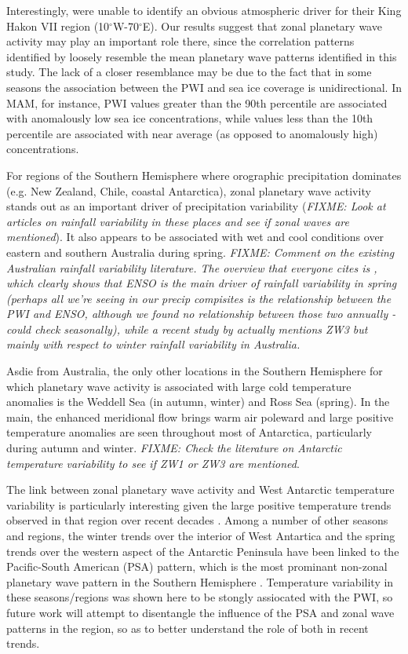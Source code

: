 Interestingly, \citet{Raphael2014} were unable to identify an obvious atmospheric driver for their King Hakon VII region (10$^{\circ}$W-70$^{\circ}$E). Our results suggest that zonal planetary wave activity may play an important role there, since the correlation patterns identified by \citet{Raphael2014} loosely resemble the mean planetary wave patterns identified in this study. The lack of a closer resemblance may be due to the fact that in some seasons the association between the PWI and sea ice coverage is unidirectional. In MAM, for instance, PWI values greater than the 90th percentile are associated with anomalously low sea ice concentrations, while values less than the 10th percentile are associated with near average (as opposed to anomalously high) concentrations.

For regions of the Southern Hemisphere where orographic precipitation dominates (e.g. New Zealand, Chile, coastal Antarctica), zonal planetary wave activity stands out as an important driver of precipitation variability (\textit{FIXME: Look at articles on rainfall variability in these places and see if zonal waves are mentioned}). It also appears to be associated with wet and cool conditions over eastern and southern Australia during spring. \textit{FIXME: Comment on the existing Australian rainfall variability literature. The overview that everyone cites is \citet{Risbey2009}, which clearly shows that ENSO is the main driver of rainfall variability in spring (perhaps all we're seeing in our precip compisites is the relationship between the PWI and ENSO, although we found no relationship between those two annually - could check seasonally), while a recent study by \citet{Frederiksen2014} actually mentions ZW3 but mainly with respect to winter rainfall variability in Australia.}

Asdie from Australia, the only other locations in the Southern Hemisphere for which planetary wave activity is associated with large cold temperature anomalies is the Weddell Sea (in autumn, winter) and Ross Sea (spring). In the main, the enhanced meridional flow brings warm air poleward and large positive temperature anomalies are seen throughout most of Antarctica, particularly during autumn and winter. \textit{FIXME: Check the literature on Antarctic temperature variability to see if ZW1 or ZW3 are mentioned}.

The link between zonal planetary wave activity and West Antarctic temperature variability is particularly interesting given the large positive temperature trends observed in that region over recent decades \citep[e.g.][]{Bromwich2013}. Among a number of other seasons and regions, the winter trends over the interior of West Antartica \citep{Ding2011} and the spring trends over the western aspect of the Antarctic Peninsula \citep{Ding2013} have been linked to the Pacific-South American (PSA) pattern, which is the most prominant non-zonal planetary wave pattern in the Southern Hemisphere \citep[e.g.][]{Mo2001}. Temperature variability in these seasons/regions was shown here to be stongly assiocated with the PWI, so future work will attempt to disentangle the influence of the PSA and zonal wave patterns in the region, so as to better understand the role of both in recent trends.   
